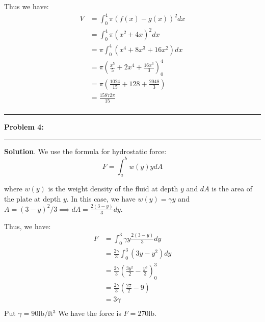 \documentclass[11pt]{article}
\newcommand\question[2]{\vspace{.25in}\hrule\textbf{#1: #2}\vspace{.5em}\hrule\vspace{.10in}}
\begin{document}
Thus we have:
\begin{align*}
  V &= \int_{0}^{4} \pi(f(x)-g(x))^2dx \\
    &= \int_{0}^{4} \pi(x^2+4x)^2dx \\
    &= \pi\int_{0}^{4} (x^4+8x^3+16x^2)dx \\
    &= \pi\left(\frac{x^5}{5}+2x^4+\frac{16x^3}{3}\right)_{0}^{4} \\
    &= \pi\left(\frac{1024}{15}+128+\frac{2048}{3}\right) \\
    &= \frac{15872\pi}{15} \\
\end{align*}

\question{Problem 4}{}

\textbf{Solution}.
We use the formula for hydrostatic force:
\[F=\int_{a}^{b}w(y)ydA\]

where $w(y)$ is the weight density of the fluid at depth $y$ and $dA$ is the area of the plate at depth $y$. 
In this case, we have $w(y)=\gamma y$ and $A=(3-y)^2/3\implies dA=\frac{2(3-y)}{3}dy$.

Thus, we have:
\begin{align*}
    F &= \int_{0}^{3} \gamma y \frac{2(3-y)}{3}dy\\
      &= \frac{2\gamma}{3}\int_{0}^{3} (3y-y^2)dy\\
      &= \frac{2\gamma}{3}\left(\frac{3y^2}{2}-\frac{y^3}{3}\right)_{0}^{3}\\
      &= \frac{2\gamma}{3}\left(\frac{27}{2}-9\right)\\
      &= 3\gamma \\
\end{align*}
Put $\gamma = 90\mathrm{lb}/\mathrm{ft^3}$
We have the force is $F=270\mathrm{lb}$.
\end{document}
